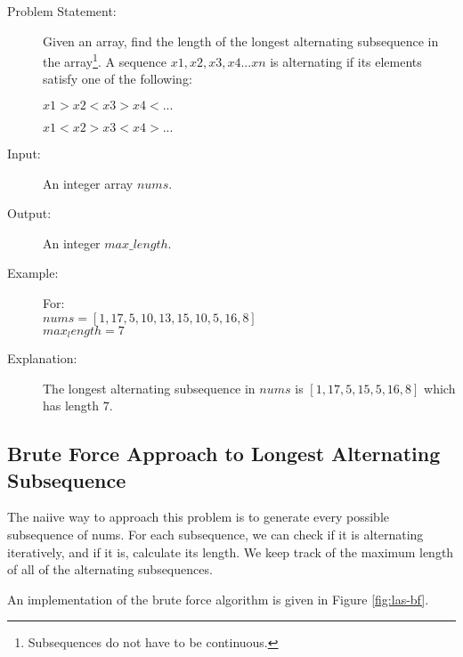\begin{description}
    \item[Problem Statement:]
        Given an array, find the length of the longest alternating subsequence in the array\footnote{Subsequences do not have to be continuous.}.
        A sequence ${x1,x2,x3,x4...xn}$ is alternating if its elements satisfy one of the following:

        $x1>x2<x3>x4<...$
        
        $x1<x2>x3<x4>...$
        
    \item[Input:]
        An integer array $nums$.
        
    \item[Output:] 
        An integer $max\_length$.
        
    \item[Example:] For:\\
        $nums = [1,17,5,10,13,15,10,5,16,8]$\\
        $max_length = 7$

    \item[Explanation:]
        The longest alternating subsequence in $nums$ is $[1,17,5,15,5,16,8]$ which has length $7$.

\end{description}

    

\subsection{Brute Force Approach to Longest Alternating Subsequence}

The naiive way to approach this problem is to generate every possible subsequence of nums. 
For each subsequence, we can check if it is alternating iteratively, and if it is, calculate its length.
We keep track of the maximum length of all of the alternating subsequences.

An implementation of the brute force algorithm is given in Figure \ref{fig:las-bf}.

